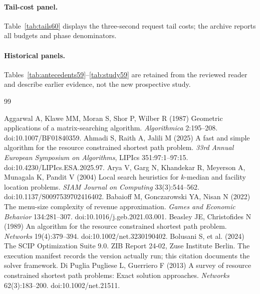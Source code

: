 \documentclass[11pt,letterpaper]{article}
\theoremstyle{definition}\newtheorem{remark}[theorem]{Remark}
\begin{document}
\paragraph{Tail-cost panel.} Table~\ref{tab:tails60} displays the three-second request tail costs; the archive reports all budgets and phase denominators.
\paragraph{Historical panels.} Tables~\ref{tab:antecedents59}--\ref{tab:study59} are retained from the reviewed reader and describe earlier evidence, not the new prospective study.
\clearpage
\begin{thebibliography}{99}\raggedright
{}
Aggarwal A, Klawe MM, Moran S, Shor P, Wilber R (1987) Geometric applications of a matrix-searching algorithm. \emph{Algorithmica} 2:195--208. doi:10.1007/BF01840359.
Ahmadi S, Raith A, Jalili M (2025) A fast and simple algorithm for the resource constrained shortest path problem. \emph{33rd Annual European Symposium on Algorithms}, LIPIcs 351:97:1--97:15. doi:10.4230/LIPIcs.ESA.2025.97.
Arya V, Garg N, Khandekar R, Meyerson A, Munagala K, Pandit V (2004) Local search heuristics for $k$-median and facility location problems. \emph{SIAM Journal on Computing} 33(3):544--562. doi:10.1137/S0097539702416402.
Babaioff M, Gonczarowski YA, Nisan N (2022) The menu-size complexity of revenue approximation. \emph{Games and Economic Behavior} 134:281--307. doi:10.1016/j.geb.2021.03.001.
Beasley JE, Christofides N (1989) An algorithm for the resource constrained shortest path problem. \emph{Networks} 19(4):379--394. doi:10.1002/net.3230190402.
Bolusani S, et al. (2024) The SCIP Optimization Suite 9.0. ZIB Report 24-02, Zuse Institute Berlin. The execution manifest records the version actually run; this citation documents the solver framework.
Di Puglia Pugliese L, Guerriero F (2013) A survey of resource constrained shortest path problems: Exact solution approaches. \emph{Networks} 62(3):183--200. doi:10.1002/net.21511.

\end{thebibliography}
\end{document}
